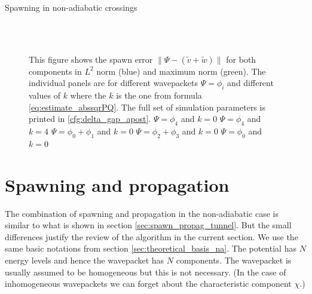 \begin{chapter}{Spawning in non-adiabatic crossings}
\begin{figure}[h!]
{  } \\
   \\
  \caption[Spawning error in the $L^2$ and maximum norm for a non-adiabatic example]{
  This figure shows the spawn error $\| \Psi - (\tilde{v} + \tilde{w})\|$ for both
  components in $L^2$ norm (blue) and maximum norm (green). The individual panels are
  for different wavepackets $\Psi = \phi_i$ and different values of $k$ where the $k$ is
  the one from formula \eqref{eq:estimate_abssqrPQ}.
  The full set of simulation parameters is printed in \ref{cfg:delta_gap_apost}.
   $\Psi = \phi_4$ and $k=0$
   $\Psi = \phi_4$ and $k=4$
   $\Psi = \phi_0 + \phi_1$ and $k=0$
   $\Psi = \phi_2 + \phi_3$ and $k=0$
   $\Psi = \phi_0$ and $k=0$
  \label{fig:spawn_delta_gap_spawn_errors2}
  }
\end{figure}


\FloatBarrier
\section{Spawning and propagation}

The combination of spawning and propagation in the non-adiabatic case is similar
to what is shown in section \ref{sec:spawn_propag_tunnel}. But the small differences
justify the review of the algorithm in the current section. We use the same basic
notations from section \ref{sec:theoretical_basis_na}. The potential has $N$ energy
levels and hence the wavepacket has $N$ components. The wavepacket is usually assumed
to be homogeneous but this is not necessary. (In the case of inhomogeneous
wavepackets we can forget about the characteristic component $\chi$.)


\end{chapter}
